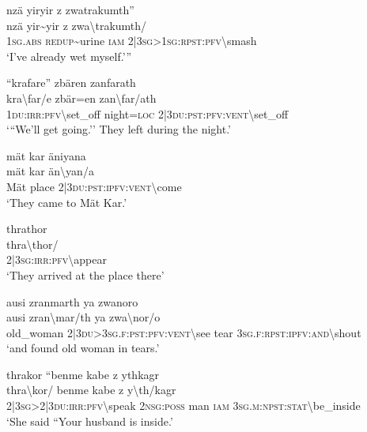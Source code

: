 \ea\label{ex:8:a1811}
nzä yiryir z zwatrakumth''\\
\gll nzä	yir{\textasciitilde}yir	z	zwa{\textbackslash}trakumth/\\
     1\textsc{sg}.\textsc{abs}	\textsc{redup}{\textasciitilde}urine	\textsc{iam}	2|3\textsc{sg}>1\textsc{sg}:\textsc{rpst}:\textsc{pfv}{\textbackslash}smash\\
\glt `I've already wet myself.'''
\z

\ea\label{ex:8:a1813}
``krafare'' zbären zanfarath\\
\gll kra{\textbackslash}far/e	zbär=en	zan{\textbackslash}far/ath\\
     1\textsc{du}:\textsc{irr}:\textsc{pfv}{\textbackslash}set\_off	night=\textsc{loc}	2|3\textsc{du}:\textsc{pst}:\textsc{pfv}:\textsc{vent}{\textbackslash}set\_off\\
\glt `{``}We'll get going.'' They left during the night.'
\z

\ea\label{ex:8:a1815}
mät kar äniyana\\
\gll mät	kar	än{\textbackslash}yan/a\\
     Mät	place	2|3\textsc{du}:\textsc{pst}:\textsc{ipfv}:\textsc{vent}{\textbackslash}come\\
\glt `They came to Mät Kar.'
\z

\ea\label{ex:8:a1816}
thrathor\\
\gll thra{\textbackslash}thor/\\
     2|3\textsc{sg}:\textsc{irr}:\textsc{pfv}{\textbackslash}appear\\
\glt `They arrived at the place there'
\z

\ea\label{ex:8:a1817}
ausi zranmarth ya zwanoro\\
\gll ausi	zran{\textbackslash}mar/th	ya	zwa{\textbackslash}nor/o\\
     old\_woman	2|3\textsc{du}>3\textsc{sg}.\textsc{f}:\textsc{pst}:\textsc{pfv}:\textsc{vent}{\textbackslash}see	tear	3\textsc{sg}.\textsc{f}:\textsc{rpst}:\textsc{ipfv}:\textsc{and}{\textbackslash}shout\\
\glt `and found old woman in tears.'
\z

\ea\label{ex:8:a1818}
thrakor ``benme kabe z ythkagr\\
\gll thra{\textbackslash}kor/	benme	kabe	z	y{\textbackslash}th/kagr\\
     2|3\textsc{sg}>2|3\textsc{du}:\textsc{irr}:\textsc{pfv}{\textbackslash}speak	2\textsc{nsg}:\textsc{poss}	man	\textsc{iam}	3\textsc{sg}.\textsc{m}:\textsc{npst}:\textsc{stat}{\textbackslash}be\_inside\\
\glt `She said ``Your husband is inside.'
\z

